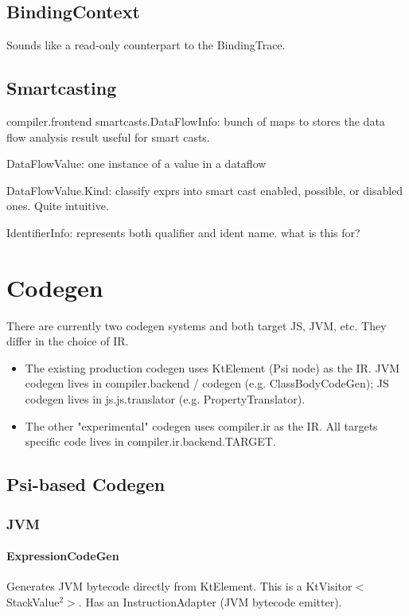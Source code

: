 \documentclass{article}
\begin{document}
\subsection{BindingContext}

Sounds like a read-only counterpart to the BindingTrace.

\subsection{Smartcasting}

compiler.frontend smartcasts.DataFlowInfo: bunch of maps to stores the data flow analysis result useful for smart casts.

DataFlowValue: one instance of a value in a dataflow

DataFlowValue.Kind: classify exprs into smart cast enabled, possible, or disabled ones. Quite intuitive.

IdentifierInfo: represents both qualifier and ident name. what is this for?

\section{Codegen}

There are currently two codegen systems and both target JS, JVM, etc. They differ in the choice of IR.

\begin{itemize}
    \item The existing production codegen uses KtElement (Psi node) as the IR. JVM codegen lives in compiler.backend / codegen (e.g. ClassBodyCodeGen); JS codegen lives in js.js.translator (e.g. PropertyTranslator).
    \item The other "experimental" codegen uses compiler.ir as the IR. All targets specific code lives in compiler.ir.backend.TARGET.
\end{itemize}

\subsection{Psi-based Codegen}

\subsubsection{JVM}

\paragraph{ExpressionCodeGen}
Generates JVM bytecode directly from KtElement. This is a KtVisitor$<$StackValue$^2$$>$. Has an InstructionAdapter (JVM bytecode emitter).
\end{document}
